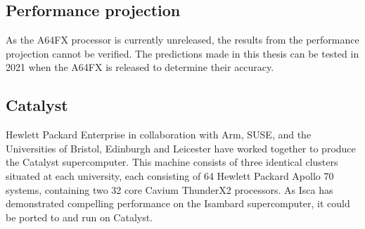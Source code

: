 \documentclass[a4paper,11pt]{report}
\begin{document}
\subsection{Performance projection}
As the A64FX processor is currently unreleased, the results from the performance projection cannot be verified. The predictions made in this thesis can be tested in 2021 when the A64FX is released to determine their accuracy.

\subsection{Catalyst}
Hewlett Packard Enterprise in collaboration with Arm, SUSE, and the Universities of Bristol, Edinburgh and Leicester have worked together to produce the Catalyst supercomputer. This machine consists of three identical clusters situated at each university, each consisting of 64 Hewlett Packard Apollo 70 systems, containing two 32 core Cavium ThunderX2 processors. As Isca has demonstrated compelling performance on the Isambard supercomputer, it could be ported to and run on Catalyst. 
\end{document}
